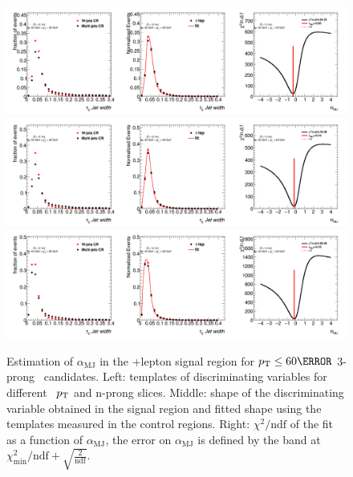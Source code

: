 		\begin{figure}
		\begin{center}
		\includegraphics[width=1\textwidth]{chapters/chapter6_HPlus/images/FFs/FFs_FIT_SR_TAULEP_3_30_35.png}
		\includegraphics[width=1\textwidth]{chapters/chapter6_HPlus/images/FFs/FFs_FIT_SR_TAULEP_3_35_40.png}
		\includegraphics[width=1\textwidth]{chapters/chapter6_HPlus/images/FFs/FFs_FIT_SR_TAULEP_3_40_60.png}
		\end{center}
		\caption{
		Estimation of $\alpha_\mathrm{MJ}$ in the \tauhad+lepton signal region for $\pt \leq 60 \GeV$
		3-prong \tauhad\ candidates. Left: templates of discriminating variables for different \tauhad\ $p_{\text{T}}$
		and n-prong slices. Middle: shape of the discriminating variable obtained in the signal region and fitted
		shape using the templates measured in the control regions. Right: $\chi^2/\mathrm{ndf}$ of the fit as a
		function of $\alpha_\mathrm{MJ}$, the error on $\alpha_\mathrm{MJ}$ is defined by the band at
		$\chi^2_\mathrm{min}/\mathrm{ndf}+\sqrt{\frac{2}{\mathrm{ndf}}}$.
		}
		\label{fig:mm:Fits:region7_3}
		\end{figure}

